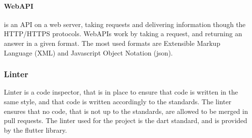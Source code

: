 \paragraph{WebAPI} is an API on a web server, taking requests and delivering information though the HTTP/HTTPS protocols. WebAPIs work by taking a request, and returning an answer in a given format. The most used formats are Extensible Markup Language (XML) and Javascript Object Notation (json). \citep{cite:WebAPI}

\subsubsection{Linter}
Linter is a code inspector, that is in place to ensure that code is written in the same style, and that code is written accordingly to the standards. The linter ensures that no code, that is not up to the standards, are allowed to be merged in pull requests. The linter used for the project is the dart standard, and is provided by the flutter library. 